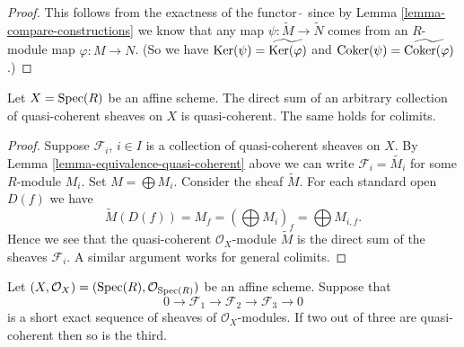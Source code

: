 \begin{proof}
This follows from the exactness of the functor $\widetilde{\ }$
since by Lemma \ref{lemma-compare-constructions} we know that any map
$\psi : \widetilde{M} \to \widetilde{N}$ comes from
an $R$-module map $\varphi : M \to N$. (So we have
$\mathop{\mathrm{Ker}}(\psi) = \widetilde{\mathop{\mathrm{Ker}}(\varphi)}$ and
$\mathop{\mathrm{Coker}}(\psi) = \widetilde{\mathop{\mathrm{Coker}}(\varphi)}$.)
\end{proof}

\begin{lemma}
\label{lemma-colimit-quasi-coherent}
Let $X = \mathop{\mathrm{Spec}}(R)$ be an affine scheme.
The direct sum of an arbitrary collection of quasi-coherent sheaves
on $X$ is quasi-coherent. The same holds for colimits.
\end{lemma}

\begin{proof}
Suppose $\mathcal{F}_i$, $i \in I$ is a collection of quasi-coherent
sheaves on $X$. By Lemma \ref{lemma-equivalence-quasi-coherent}
above we can write $\mathcal{F}_i = \widetilde{M_i}$ for some $R$-module
$M_i$. Set $M = \bigoplus M_i$. Consider the sheaf $\widetilde{M}$.
For each standard open $D(f)$ we have
$$
\widetilde{M}(D(f)) = M_f =
\left(\bigoplus M_i\right)_f =
\bigoplus M_{i, f}.
$$
Hence we see that the quasi-coherent $\mathcal{O}_X$-module
$\widetilde{M}$ is the direct sum of the sheaves $\mathcal{F}_i$.
A similar argument works for general colimits.
\end{proof}

\begin{lemma}
\label{lemma-extension-quasi-coherent}
Let $(X, \mathcal{O}_X) = (\mathop{\mathrm{Spec}}(R), \mathcal{O}_{\mathop{\mathrm{Spec}}(R)})$
be an affine scheme. Suppose that
$$
0 \to
\mathcal{F}_1 \to
\mathcal{F}_2 \to
\mathcal{F}_3 \to
0
$$
is a short exact sequence of sheaves of $\mathcal{O}_X$-modules.
If two out of three are quasi-coherent then so is the third.
\end{lemma}

